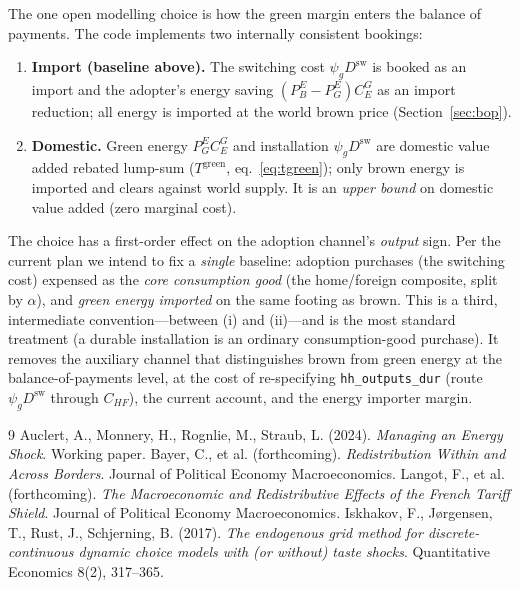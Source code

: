 \documentclass[11pt]{article}
\newcommand{\dsw}{D^{\mathrm{sw}}}
\newcommand{\PEB}{P^{E}_{B}}
\newcommand{\PEG}{P^{E}_{G}}
\begin{document}
The one open modelling choice is how the green margin enters the balance of
payments. The code implements two internally consistent bookings:
\begin{enumerate}[label=(\roman*),leftmargin=2em]
\item \textbf{Import (baseline above).} The switching cost $\psi_g\dsw$ is
booked as an import and the adopter's energy saving $(\PEB-\PEG)C^{G}_{E}$ as an
import reduction; all energy is imported at the world brown price
(Section~\ref{sec:bop}).
\item \textbf{Domestic.} Green energy $\PEG C^{G}_{E}$ and installation
$\psi_g\dsw$ are domestic value added rebated lump-sum ($T^{\text{green}}$,
eq.~\eqref{eq:tgreen}); only brown energy is imported and clears against world
supply. It is an \emph{upper bound} on domestic value added (zero marginal cost).
\end{enumerate}
The choice has a first-order effect on the adoption channel's \emph{output} sign.
Per the current plan we intend to fix a \emph{single} baseline: adoption
purchases (the switching cost) expensed as the \emph{core consumption good} (the
home/foreign composite, split by $\alpha$), and \emph{green energy imported} on
the same footing as brown. This is a third, intermediate convention---between
(i) and (ii)---and is the most standard treatment (a durable installation is an
ordinary consumption-good purchase). It removes the auxiliary channel that
distinguishes brown from green energy at the balance-of-payments level, at the
cost of re-specifying \texttt{hh\_outputs\_dur} (route $\psi_g\dsw$ through
$C_{HF}$), the current account, and the energy importer margin.

\begin{thebibliography}{9}
 Auclert, A., Monnery, H., Rognlie, M., Straub, L. (2024).
\emph{Managing an Energy Shock}. Working paper.
 Bayer, C., et al. (forthcoming). \emph{Redistribution Within
and Across Borders}. Journal of Political Economy Macroeconomics.
 Langot, F., et al. (forthcoming). \emph{The Macroeconomic
and Redistributive Effects of the French Tariff Shield}. Journal of Political
Economy Macroeconomics.
 Iskhakov, F., J{\o}rgensen, T., Rust, J., Schjerning, B.
(2017). \emph{The endogenous grid method for discrete-continuous dynamic choice
models with (or without) taste shocks}. Quantitative Economics 8(2), 317--365.
\end{thebibliography}
\end{document}
